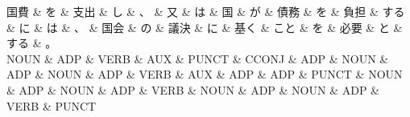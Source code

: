 \documentclass[tikz,border=5pt]{standalone}
\begin{document}
\normalsize
\begin{dependency}[edge unit distance=12.0pt]
    \begin{deptext}[column sep=1em]
        国費 \& を \& 支出 \& し \& 、 \& 又 \& は \& 国 \& が \& 債務 \& を \& 負担 \& する \& に \& は \& 、 \& 国会 \& の \& 議決 \& に \& 基く \& こと \& を \& 必要 \& と \& する \& 。\\
        NOUN \& ADP \& VERB \& AUX \& PUNCT \& CCONJ \& ADP \& NOUN \& ADP \& NOUN \& ADP \& VERB \& AUX \& ADP \& ADP \& PUNCT \& NOUN \& ADP \& NOUN \& ADP \& VERB \& NOUN \& ADP \& NOUN \& ADP \& VERB \& PUNCT\\
    \end{deptext}
\end{dependency}
\end{document}
